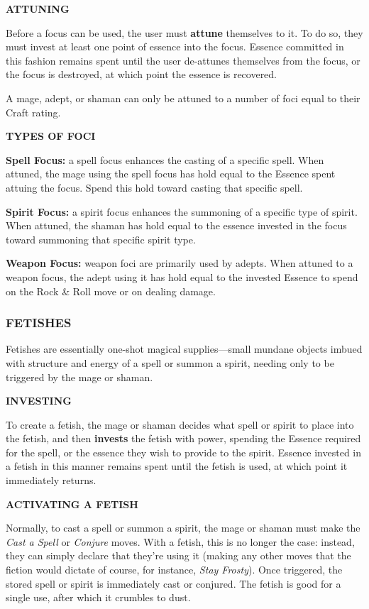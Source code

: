 \documentclass[oneside,10pt]{article}
\begin{document}
\begin{multicols}{2}
\textbf{ATTUNING}

Before a focus can be used, the user must \textbf{attune} themselves
to it. To do so, they must invest at least one point of essence
into the focus. Essence committed in this fashion remains
spent until the user de-attunes themselves from the focus, or
the focus is destroyed, at which point the essence is recovered.

A mage, adept, or shaman can only be attuned to a number
of foci equal to their Craft rating.

\textbf{TYPES OF FOCI}

\begin{adjustwidth*}{.5cm}{.5cm}
\textbf{Spell Focus:} a spell focus enhances the casting of a specific
spell. When attuned, the mage using the spell focus has
hold equal to the Essence spent attuing the focus. Spend
this hold toward casting that specific spell.

\textbf{Spirit Focus:} a spirit focus enhances the summoning of a
specific type of spirit. When attuned, the shaman has hold
equal to the essence invested in the focus toward summoning that specific spirit type.

\textbf{Weapon Focus:} weapon foci are primarily used by adepts.
When attuned to a weapon focus, the adept using it has
hold equal to the invested Essence to spend on the Rock
\& Roll move or on dealing damage.
\end{adjustwidth*}

\subsubsection{FETISHES}
Fetishes are essentially one-shot magical supplies—small
mundane objects imbued with structure and energy of a spell
or summon a spirit, needing only to be triggered by the
mage or shaman.

\textbf{INVESTING}

To create a fetish, the mage or shaman decides what spell or
spirit to place into the fetish, and then \textbf{invests} the fetish with
power, spending the Essence required for the spell, or the
essence they wish to provide to the spirit. Essence invested
in a fetish in this manner remains spent until the fetish is used,
at which point it immediately returns.

\textbf{ACTIVATING A FETISH}

Normally, to cast a spell or summon a spirit, the mage or
shaman must make the \textit{Cast a Spell} or \textit{Conjure} moves. With
a fetish, this is no longer the case: instead, they can simply
declare that they’re using it (making any other moves that
the fiction would dictate of course, for instance, \textit{Stay Frosty}).
Once triggered, the stored spell or spirit is immediately cast
or conjured. The fetish is good for a single use, after which it
crumbles to dust.

\end{multicols}
\end{document}
